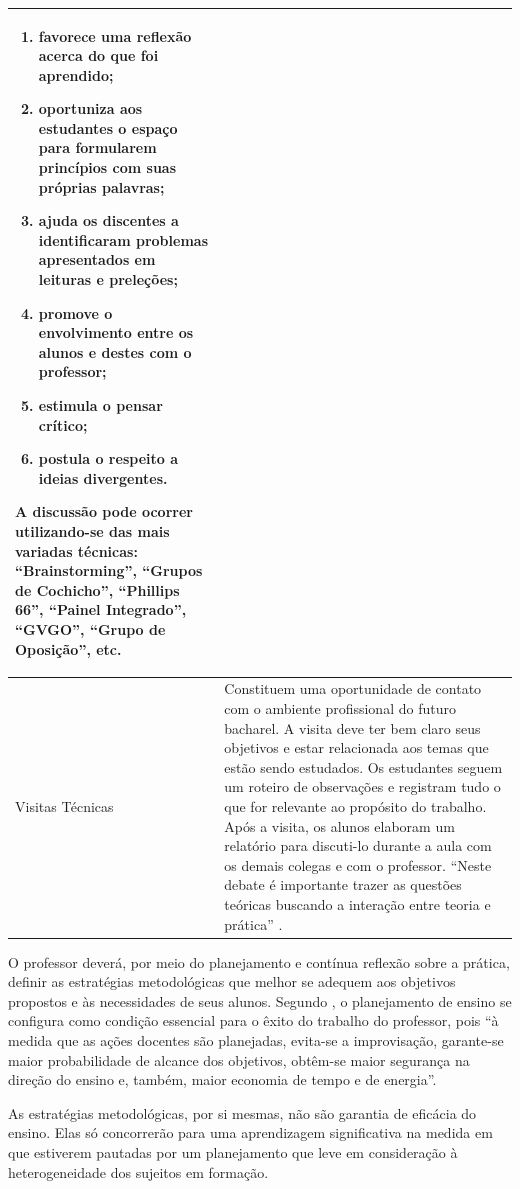 \documentclass[
	12pt,				%
	openright,			%
  oneside,     %
	a4paper,			%
 hyphens,
	chapter=TITLE,		%
	english,			%
	french,				%
	spanish,			%
	brazil				%
	]{abntex2}
\begin{document}
\begin{center}
\begin{scriptsize}
\begin{longtable}{p{4.5cm}p{10cm}}
        \begin{enumerate}[midsep]
            \item favorece uma reflexão acerca do que foi aprendido;
            \item oportuniza aos estudantes o espaço para formularem princípios com suas próprias palavras;
            \item ajuda os discentes a identificaram problemas apresentados em leituras e preleções;
            \item promove o envolvimento entre os alunos e destes com o professor;
            \item estimula o pensar crítico; 	
            \item postula o respeito a ideias divergentes.
        \end{enumerate}

        A discussão pode ocorrer utilizando-se das mais variadas técnicas: “Brainstorming”, “Grupos de Cochicho”, “Phillips 66”, “Painel Integrado”, “GVGO”, “Grupo de Oposição”, etc.\\ \midrule
        Visitas Técnicas & Constituem uma oportunidade de contato com o ambiente profissional do futuro bacharel. A visita deve ter bem claro seus objetivos e estar relacionada aos temas que estão sendo estudados. Os estudantes seguem um roteiro de observações e registram tudo o que for relevante ao propósito do trabalho. Após a visita, os alunos elaboram um relatório para discuti-lo durante a aula com os demais colegas e com o professor. “Neste debate é importante trazer as questões teóricas buscando a interação entre teoria e prática” \cite{masetto2012competencia}.\\
      \bottomrule
\end{longtable}
\end{scriptsize}      
\end{center}

O professor deverá, por meio do planejamento e contínua reflexão sobre a prática, definir as estratégias metodológicas que melhor se adequem aos objetivos propostos e às necessidades de seus alunos. Segundo , o planejamento de ensino se configura como condição essencial para o êxito do trabalho do professor, pois “à medida que as ações docentes são planejadas, evita-se a improvisação, garante-se maior probabilidade de alcance dos objetivos, obtêm-se maior segurança na direção do ensino e, também, maior economia de tempo e de energia”.
	
As estratégias metodológicas, por si mesmas, não são garantia de eficácia do ensino. Elas só concorrerão para uma aprendizagem significativa na medida em que estiverem pautadas por um planejamento que leve em consideração à heterogeneidade dos sujeitos em formação.
\end{document}
